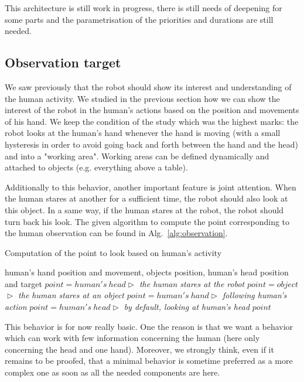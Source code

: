 \documentclass[english,a4paper,11pt,twoside]{StyleThese}
\begin{document}
This architecture is still work in progress, there is still needs of deepening for some parts and the parametrisation of the priorities and durations are still needed.

\subsection{Observation target}

We saw previously that the robot should show its interest and understanding of the human activity. We studied in the previous section how we can show the interest of the robot in the human's actions based on the position and movements of his hand. We keep the condition of the study which was the highest marks: the robot looks at the human's hand whenever the hand is moving (with a small hysteresis in order to avoid going back and forth between the hand and the head) and into a "working area". Working areas can be defined dynamically and attached to objects (e.g. everything above a table).

Additionally to this behavior, another important feature is joint attention. When the human stares at another for a sufficient time, the robot should also look at this object. In a same way, if the human stares at the robot, the robot should turn back his look. The given algorithm to compute the point corresponding to the human observation can be found in Alg.~\ref{alg:observation}.


\begin{algorithm}
\caption{Computation of the point to look based on human's activity}
\label{alg:observation}
\begin{algorithmic}
\REQUIRE human's hand position and movement, objects position, human's  head position and target
\STATE $point = human's \ head$\hfill \textit{$\vartriangleright$ the human stares at the robot}
\STATE $point = object$\hfill \textit{$\vartriangleright$ the human stares at an object}
\STATE $point = human's \ hand$\hfill \textit{$\vartriangleright$ following human's action}
\ELSE
\STATE $point = human's \ head$\hfill \textit{$\vartriangleright$ by default, looking at human's head}
\ENDIF
\RETURN $point$
\end{algorithmic}
\end{algorithm}

This behavior is for now really basic. One the reason is that we want a behavior which can work with few information concerning the human (here only concerning the head and one hand). Moreover, we strongly think, even if it remains to be proofed, that a minimal behavior is sometime preferred as a more complex one as soon as all the needed components are here.
\end{document}
